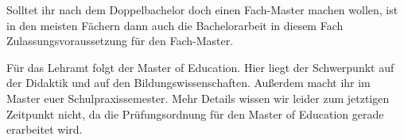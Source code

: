 Solltet ihr nach dem Doppelbachelor doch einen Fach-Master machen wollen, ist in den meisten Fächern dann auch die Bachelorarbeit in diesem Fach Zulassungsvoraussetzung für den Fach-Master.

Für das Lehramt folgt der Master of Education. Hier liegt der Schwerpunkt auf der Didaktik und auf den Bildungswissenschaften. Außerdem macht ihr im Master euer Schulpraxissemester. Mehr Details wissen wir leider zum jetztigen Zeitpunkt nicht, da die Prüfungsordnung für den Master of Education gerade erarbeitet wird. 
